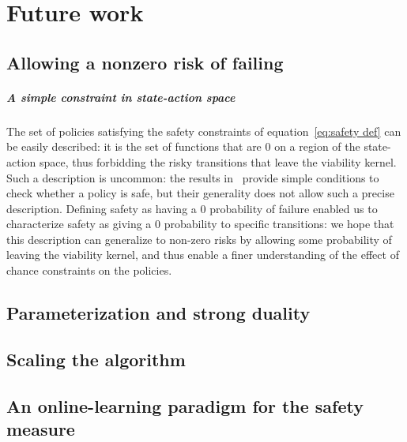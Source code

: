 \chapter{Future work}


\section{Allowing a nonzero risk of failing} \label{sec:future nonzero}
\paragraph{A simple constraint in state-action space} The set of policies satisfying the safety constraints of equation~\eqref{eq:safety def} can be easily described: it is the set of functions that are $0$ on a region of the state-action space, thus forbidding the risky transitions that leave the viability kernel. Such a description is uncommon: the results in~\cite{altman1999constrained} provide simple conditions to check whether a policy is safe, but their generality does not allow such a precise description. Defining safety as having a $0$ probability of failure enabled us to characterize safety as giving a $0$ probability to specific transitions: we hope that this description can generalize to non-zero risks by allowing some probability of leaving the viability kernel, and thus enable a finer understanding of the effect of chance constraints on the policies.
\section{Parameterization and strong duality}

\section{Scaling the algorithm}

\section{An online-learning paradigm for the safety measure}